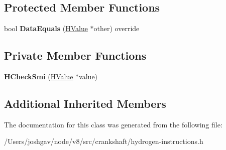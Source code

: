 \subsection*{Protected Member Functions}
\begin{DoxyCompactItemize}
\item 
bool {\bfseries Data\+Equals} (\hyperlink{classv8_1_1internal_1_1_h_value}{H\+Value} $\ast$other) override\hypertarget{classv8_1_1internal_1_1_h_check_smi_a3f2401e396c0cf057da258b681e4baf5}{}\label{classv8_1_1internal_1_1_h_check_smi_a3f2401e396c0cf057da258b681e4baf5}

\end{DoxyCompactItemize}
\subsection*{Private Member Functions}
\begin{DoxyCompactItemize}
\item 
{\bfseries H\+Check\+Smi} (\hyperlink{classv8_1_1internal_1_1_h_value}{H\+Value} $\ast$value)\hypertarget{classv8_1_1internal_1_1_h_check_smi_aa56d59a84623b94750850d6ccc1ab15d}{}\label{classv8_1_1internal_1_1_h_check_smi_aa56d59a84623b94750850d6ccc1ab15d}

\end{DoxyCompactItemize}
\subsection*{Additional Inherited Members}


The documentation for this class was generated from the following file\+:\begin{DoxyCompactItemize}
\item 
/\+Users/joshgav/node/v8/src/crankshaft/hydrogen-\/instructions.\+h\end{DoxyCompactItemize}
